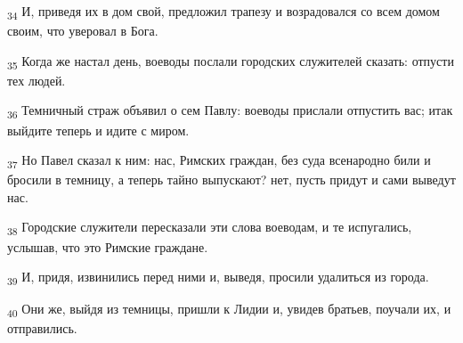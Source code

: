 \begin{tcolorbox}
\textsubscript{34} И, приведя их в дом свой, предложил трапезу и возрадовался со всем домом своим, что уверовал в Бога.
\end{tcolorbox}
\begin{tcolorbox}
\textsubscript{35} Когда же настал день, воеводы послали городских служителей сказать: отпусти тех людей.
\end{tcolorbox}
\begin{tcolorbox}
\textsubscript{36} Темничный страж объявил о сем Павлу: воеводы прислали отпустить вас; итак выйдите теперь и идите с миром.
\end{tcolorbox}
\begin{tcolorbox}
\textsubscript{37} Но Павел сказал к ним: нас, Римских граждан, без суда всенародно били и бросили в темницу, а теперь тайно выпускают? нет, пусть придут и сами выведут нас.
\end{tcolorbox}
\begin{tcolorbox}
\textsubscript{38} Городские служители пересказали эти слова воеводам, и те испугались, услышав, что это Римские граждане.
\end{tcolorbox}
\begin{tcolorbox}
\textsubscript{39} И, придя, извинились перед ними и, выведя, просили удалиться из города.
\end{tcolorbox}
\begin{tcolorbox}
\textsubscript{40} Они же, выйдя из темницы, пришли к Лидии и, увидев братьев, поучали их, и отправились.
\end{tcolorbox}
